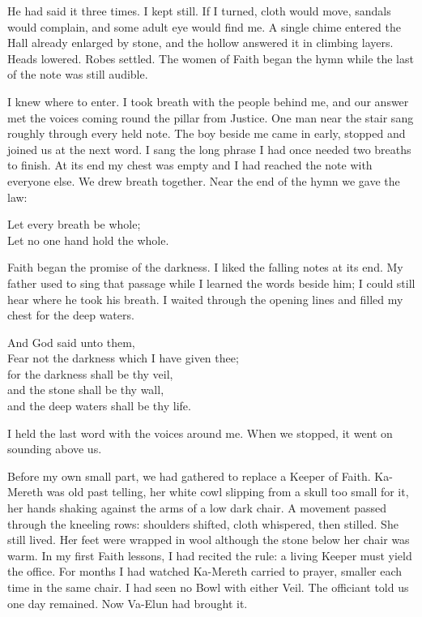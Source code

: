 He had said it three times. I kept still. If I turned, cloth would move, sandals would complain, and some adult eye would find me. A single chime entered the Hall already enlarged by stone, and the hollow answered it in climbing layers. Heads lowered. Robes settled. The women of Faith began the hymn while the last of the note was still audible.\par

I knew where to enter. I took breath with the people behind me, and our answer met the voices coming round the pillar from Justice. One man near the stair sang roughly through every held note. The boy beside me came in early, stopped and joined us at the next word. I sang the long phrase I had once needed two breaths to finish. At its end my chest was empty and I had reached the note with everyone else. We drew breath together. Near the end of the hymn we gave the law:\par

\begin{scripture}
Let every breath be whole;\\
Let no one hand hold the whole.
\end{scripture}

Faith began the promise of the darkness. I liked the falling notes at its end. My father used to sing that passage while I learned the words beside him; I could still hear where he took his breath. I waited through the opening lines and filled my chest for the deep waters.\par

\begin{scripture}
And God said unto them, \\
Fear not the darkness which I have given thee; \\
for the darkness shall be thy veil, \\
and the stone shall be thy wall, \\
and the deep waters shall be thy life.
\end{scripture}

I held the last word with the voices around me. When we stopped, it went on sounding above us.\par

\ornament

Before my own small part, we had gathered to replace a Keeper of Faith. Ka-Mereth was old past telling, her white cowl slipping from a skull too small for it, her hands shaking against the arms of a low dark chair. A movement passed through the kneeling rows: shoulders shifted, cloth whispered, then stilled. She still lived. Her feet were wrapped in wool although the stone below her chair was warm. In my first Faith lessons, I had recited the rule: a living Keeper must yield the office. For months I had watched Ka-Mereth carried to prayer, smaller each time in the same chair. I had seen no Bowl with either Veil. The officiant told us one day remained. Now Va-Elun had brought it.\par

